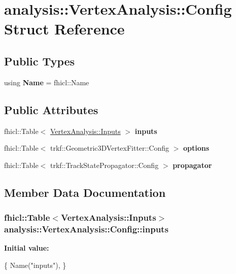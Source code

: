 \hypertarget{structanalysis_1_1VertexAnalysis_1_1Config}{}\section{analysis\+:\+:Vertex\+Analysis\+:\+:Config Struct Reference}
\label{structanalysis_1_1VertexAnalysis_1_1Config}
\subsection*{Public Types}
\begin{DoxyCompactItemize}
\item 
using {\bfseries Name} = fhicl\+::\+Name\hypertarget{structanalysis_1_1VertexAnalysis_1_1Config_adf2aa6081f2faa0f0716e027f96c513c}{}\label{structanalysis_1_1VertexAnalysis_1_1Config_adf2aa6081f2faa0f0716e027f96c513c}

\end{DoxyCompactItemize}
\subsection*{Public Attributes}
\begin{DoxyCompactItemize}
\item 
fhicl\+::\+Table$<$ \hyperlink{structanalysis_1_1VertexAnalysis_1_1Inputs}{Vertex\+Analysis\+::\+Inputs} $>$ {\bfseries inputs}
\item 
fhicl\+::\+Table$<$ trkf\+::\+Geometric3\+D\+Vertex\+Fitter\+::\+Config $>$ {\bfseries options}
\item 
fhicl\+::\+Table$<$ trkf\+::\+Track\+State\+Propagator\+::\+Config $>$ {\bfseries propagator}
\end{DoxyCompactItemize}


\subsection{Member Data Documentation}
\subsubsection[{\texorpdfstring{inputs}{inputs}}]{\setlength{\rightskip}{0pt plus 5cm}fhicl\+::\+Table$<${\bf Vertex\+Analysis\+::\+Inputs}$>$ analysis\+::\+Vertex\+Analysis\+::\+Config\+::inputs}\hypertarget{structanalysis_1_1VertexAnalysis_1_1Config_af105c486b824d958515bfa568f97e231}{}\label{structanalysis_1_1VertexAnalysis_1_1Config_af105c486b824d958515bfa568f97e231}
{\bfseries Initial value\+:}
\begin{DoxyCode}
\{
      Name(\textcolor{stringliteral}{"inputs"}),
    \}
\end{DoxyCode}
